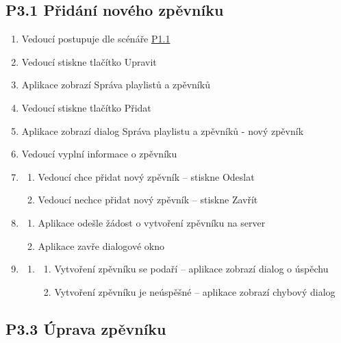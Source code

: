 \subsection{P3.1 Přidání nového zpěvníku}
\label{P3.1}

\begin{enumerate}
    \item Vedoucí postupuje dle scénáře \hyperref[P1.1]{P1.1}
    \item Vedoucí stiskne tlačítko Upravit
    \item Aplikace zobrazí Správa playlistů a zpěvníků
    \item Vedoucí stiskne tlačítko Přidat
    \item Aplikace zobrazí dialog Správa playlistu a zpěvníků - nový zpěvník
    \item Vedoucí vyplní informace o zpěvníku
    \item \begin{enumerate}
        \item Vedoucí chce přidat nový zpěvník -- stiskne Odeslat
        \item Vedoucí nechce přidat nový zpěvník -- stiskne Zavřít
    \end{enumerate}
    \item \begin{enumerate}
        \item Aplikace odešle žádost o vytvoření zpěvníku na server
        \item Aplikace zavře dialogové okno
    \end{enumerate}
    \item \begin{enumerate}
        \item \begin{enumerate}
            \item Vytvoření zpěvníku se podaří -- aplikace zobrazí dialog o úspěchu
	    \item Vytvoření zpěvníku je neúspěšné -- aplikace zobrazí chybový dialog
        \end{enumerate}
    \end{enumerate}
\end{enumerate}

\subsection{P3.3 Úprava zpěvníku}
\label{P3.3}

